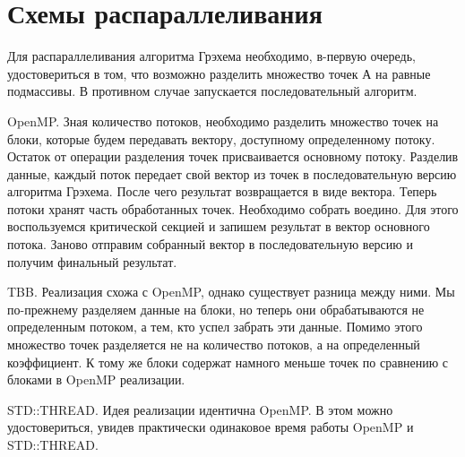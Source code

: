 \documentclass{report}
\begin{document}
\section*{Схемы распараллеливания}
Для распараллеливания алгоритма Грэхема необходимо, в-первую очередь, удостовериться в том, что возможно разделить множество точек А на равные подмассивы. В противном случае запускается последовательный алгоритм.
\par OpenMP. Зная количество потоков, необходимо разделить множество точек на блоки, которые будем передавать вектору, доступному определенному потоку. Остаток от операции разделения точек присваивается основному потоку. Разделив данные, каждый поток передает свой вектор из точек в последовательную версию алгоритма Грэхема. После чего результат возвращается в виде вектора. Теперь потоки хранят часть обработанных точек. Необходимо собрать воедино. Для этого воспользуемся критической секцией и запишем результат в вектор основного потока. Заново отправим собранный вектор в последовательную версию и получим финальный результат.
\par TBB. Реализация схожа с OpenMP, однако существует разница между ними. Мы по-прежнему разделяем данные на блоки, но теперь они обрабатываются не определенным потоком, а тем, кто успел забрать эти данные. Помимо этого множество точек разделяется не на количество потоков, а на определенный коэффициент. К тому же блоки содержат намного меньше точек по сравнению с блоками в OpenMP реализации.
\par STD::THREAD. Идея реализации идентична OpenMP. В этом можно удостовериться, увидев практически одинаковое время работы OpenMP и STD::THREAD.
\newpage

\end{document}
